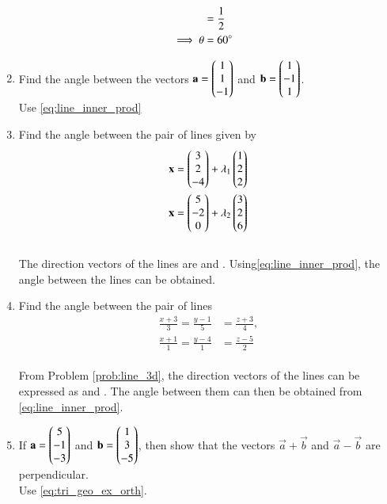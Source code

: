\begin{enumerate}[label=\arabic*.,ref=\thesubsection.\theenumi]
\begin{align}
\\
&=\frac{1}{2}
\\
\implies \theta &= 60\degree
\end{align}
%
\item Find the angle between the vectors 
$\mathbf{a}=\begin{pmatrix}1\\1\\-1\end{pmatrix}$
  and 
$\mathbf{b}=\begin{pmatrix}1\\-1\\1\end{pmatrix}$.
%
\\
\solution Use \eqref{eq:line_inner_prod}
%
\item Find the angle between the pair of lines given by 
\begin{align}
\mathbf{x} &= \begin{pmatrix}3\\2\\-4\end{pmatrix} + \lambda_1\begin{pmatrix}1 \\ 2 \\2\end{pmatrix}
\\
\mathbf{x} &= \begin{pmatrix}5\\-2\\0\end{pmatrix} + \lambda_2\begin{pmatrix}3 \\ 2 \\6\end{pmatrix}
\end{align}
%
\\
\solution The direction vectors of the lines are  and .   Using\eqref{eq:line_inner_prod}, the angle between the lines can be obtained. 
\item Find the angle between the pair of lines
\begin{align}
\frac{x+3}{3} = \frac{y-1}{5} &= \frac{z+3}{4}, 
\\
\frac{x+1}{1} = \frac{y-4}{1} &= \frac{z-5}{2} 
\end{align}
%
\\
\solution From Problem \ref{prob:line_3d}, the direction vectors of the lines can be expressed as  and .  The angle between them can then be obtained from \eqref{eq:line_inner_prod}.
%
\item If 
$\mathbf{a}=\begin{pmatrix}5\\-1\\-3\end{pmatrix}$
  and 
$\mathbf{b}=\begin{pmatrix}1\\3\\-5\end{pmatrix}$,
%
then show that the vectors $\vec{a}+\vec{b}$ and $\vec{a}-\vec{b}$ are perpendicular.
%
\\
\solution Use \eqref{eq:tri_geo_ex_orth}.
%


\end{enumerate}

